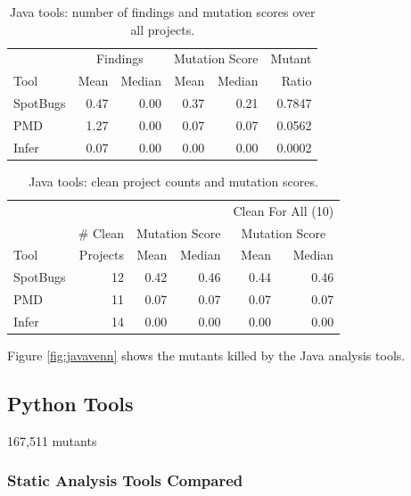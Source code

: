 \begin{table}
  \begin{tabular}{l|r|r|r|r|r}
    & \multicolumn{2}{|c|}{Findings} & \multicolumn{2}{|c|}{Mutation Score}  & Mutant \\
    Tool & Mean & Median & Mean & Median & Ratio\\
    \hline
    \hline
    SpotBugs & 0.47 & 0.00 & 0.37 & 0.21 & 0.7847 \\
    \hline
    PMD & 1.27 & 0.00 & 0.07 & 0.07 & 0.0562 \\
    \hline
    Infer & 0.07 & 0.00 & 0.00 & 0.00 &  0.0002 \\
    \hline
  \end{tabular}
  \caption{Java tools: number of findings and mutation scores over all projects.}
  \label{tab:scorejava}
\end{table}

\begin{table}
  \begin{tabular}{l|r|r|r|r|r}
    & & \multicolumn{2}{|c|}{} & \multicolumn{2}{|c}{Clean For All (10)} \\
    & \# Clean & \multicolumn{2}{|c|}{Mutation Score} &  \multicolumn{2}{|c}{Mutation Score}\\
    Tool & Projects & Mean & Median & Mean & Median\\
    \hline
    \hline
    SpotBugs & 12 & 0.42 & 0.46 & 0.44 & 0.46 \\
    \hline
    PMD & 11 & 0.07 & 0.07 & 0.07 & 0.07 \\
    \hline
    Infer & 14 & 0.00 & 0.00 & 0.00 & 0.00 \\
    \hline
  \end{tabular}
  \caption{Java tools: clean project counts and mutation scores.}
  \label{tab:cleanjava}
\end{table}

Figure \ref{fig:javavenn} shows the mutants killed by the Java analysis tools.

\subsection{Python Tools}

167,511 mutants

\subsubsection{Static Analysis Tools Compared}

